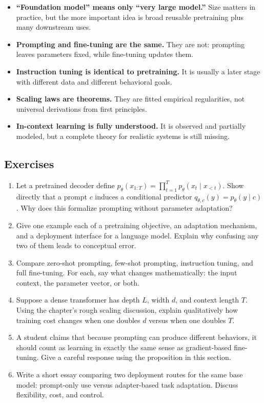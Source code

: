 \begin{itemize}
    \item \textbf{``Foundation model'' means only ``very large model.''} Size matters in practice, but the more important idea is broad reusable pretraining plus many downstream uses.
    \item \textbf{Prompting and fine-tuning are the same.} They are not: prompting leaves parameters fixed, while fine-tuning updates them.
    \item \textbf{Instruction tuning is identical to pretraining.} It is usually a later stage with different data and different behavioral goals.
    \item \textbf{Scaling laws are theorems.} They are fitted empirical regularities, not universal derivations from first principles.
    \item \textbf{In-context learning is fully understood.} It is observed and partially modeled, but a complete theory for realistic systems is still missing.
\end{itemize}

\subsection*{Exercises}

\begin{enumerate}
    \item Let a pretrained decoder define $p_{\theta}(x_{1:T}) = \prod_{t=1}^{T} p_{\theta}(x_t \mid x_{<t})$. Show directly that a prompt $c$ induces a conditional predictor $q_{\theta,c}(y)=p_{\theta}(y\mid c)$. Why does this formalize prompting without parameter adaptation?
    \item Give one example each of a pretraining objective, an adaptation mechanism, and a deployment interface for a language model. Explain why confusing any two of them leads to conceptual error.
    \item Compare zero-shot prompting, few-shot prompting, instruction tuning, and full fine-tuning. For each, say what changes mathematically: the input context, the parameter vector, or both.
    \item Suppose a dense transformer has depth $L$, width $d$, and context length $T$. Using the chapter's rough scaling discussion, explain qualitatively how training cost changes when one doubles $d$ versus when one doubles $T$.
    \item A student claims that because prompting can produce different behaviors, it should count as learning in exactly the same sense as gradient-based fine-tuning. Give a careful response using the proposition in this section.
    \item Write a short essay comparing two deployment routes for the same base model: prompt-only use versus adapter-based task adaptation. Discuss flexibility, cost, and control.
\end{enumerate}

